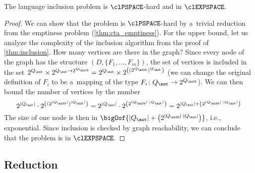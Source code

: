 \begin{theorem}
    The \lsta language inclusion problem is $\clPSPACE$-hard and in $\clEXPSPACE$.
\end{theorem}
\begin{proof}
We can show that the problem is $\clPSPACE$-hard by a~trivial reduction from the
emptiness problem (\cref{thm:cta_emptiness}).
For the upper bound,
let us analyze the complexity of the inclusion algorithm from the proof of
  \cref{thm:inclusion}.
How many vertices are there in the graph?
Since every node of the graph has the structure $(D, \{F_1, \ldots, F_m\})$,
the set of vertices is included in the set $2^{Q_\aut} \times 2^{Q_\aut \to
2^{Q_\autb}} = 2^{Q_\aut} \times 2^{\left((2^{Q_\autb})^{Q_\aut}\right)}$ (we
can change the original definition of $F_i$ to be a~mapping
of the type $F_i\colon Q_\aut \to 2^{Q_{\autb}}$).
We can then bound the number of vertices by the number
\begin{equation}
  2^{|Q_\aut|} \cdot 2^{\left((2^{|Q_\autb|})^{|Q_\aut|}\right)}
  =
  2^{|Q_\aut|} \cdot 2^{\left(2^{|Q_\autb|\cdot|Q_\aut|}\right)}
  =
  2^{|Q_\aut| + \left(2^{|Q_\autb|\cdot|Q_\aut|}\right)}
\end{equation}
%
The size of one node is then in $\bigOof{|Q_\aut| +
\left(2^{|Q_\autb|\cdot|Q_\aut|}\right)}$, i.e., exponential.
Since inclusion is checked by graph reachability, we can conclude that the
problem is in $\clEXPSPACE$.
\end{proof}

\vspace{-0.0mm}
\subsection{\lsta Reduction}\label{subsec:reduce}
\vspace{-0.0mm}


